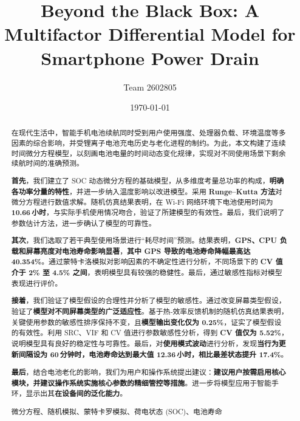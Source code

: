 \documentclass{mcmthesis}  %
\title{Beyond the Black Box: A Multifactor Differential Model for Smartphone Power Drain}  %
\author{\small Team 2602805}  %
\date{\today}  %
\begin{document}
	\begin{abstract}  %
		
		在现代生活中，智能手机电池续航同时受到用户使用强度、处理器负载、环境温度等多因素的综合影响，并受锂离子电池充电历史与老化进程的制约。为此，本文构建了连续时间微分方程模型，以刻画电池电量的时间动态变化规律，实现对不同使用场景下剩余续航时间的准确预测。
		
		\textbf{首先}，我们建立了 SOC 动态微分方程的基础模型，从多维度考量总功率的构成，\textbf{明确各功率分量的特性}，并进一步纳入温度影响以改进模型。采用 \textbf{Runge–Kutta 方法}对微分方程进行数值求解。随机仿真结果表明，在 Wi‑Fi 网络环境下电池使用时间为 \textbf{10.66 小时}，与实际手机使用情况吻合，验证了所建模型的有效性。最后，我们说明了参数估计方法，进一步确认了模型的可靠性。
		
		\textbf{其次}，我们选取了若干典型使用场景进行“耗尽时间”预测。结果表明，\textbf{GPS、CPU 负载和屏幕亮度对电池寿命影响显著}，\textbf{其中 GPS 导致的电池寿命降幅最高达 40.354\%}。通过蒙特卡洛模拟对影响因素的不确定性进行分析，不同场景下的 \textbf{CV 值介于 2\% 至 4.5\% 之间}，表明模型具有较强的稳健性。最后，通过敏感性指标对模型表现进行评价。
		
		\textbf{接着}，我们验证了模型假设的合理性并分析了模型的敏感性。通过改变屏幕类型假设，验证了\textbf{模型对不同屏幕类型的广泛适应性}。基于热‑效率反馈机制的随机仿真结果表明，关键使用参数的敏感性排序保持不变，且\textbf{模型输出变化仅为 0.25\%}，证实了模型假设的有效性。利用 SRC、VIF 和 CV 值进行参数敏感性分析，得到 \textbf{CV 值仅为 5.52\%}，说明模型具有良好的稳定性与可靠性。最后，对\textbf{使用模式波动}进行分析，发现\textbf{当行为更新间隔设为 60 分钟时，电池寿命达到最大值 12.36 小时，相比最差状态提升 17.4\%}。
		
		\textbf{最后}，结合电池老化的影响，我们为用户和操作系统提出建议：\textbf{建议用户按需启用核心模块，并建议操作系统实施核心参数的精细管控等措施}。进一步将模型应用于智能手环，显示出其\textbf{在设备间的泛化能力}。
		\begin{keywords}
			微分方程、随机模拟、蒙特卡罗模拟、荷电状态 (SOC)、电池寿命
		\end{keywords}
	\end{abstract}  %
	\maketitle  %
	
	\tableofcontents  %
	\setcounter{page}{2} %
	
	
\end{document}
